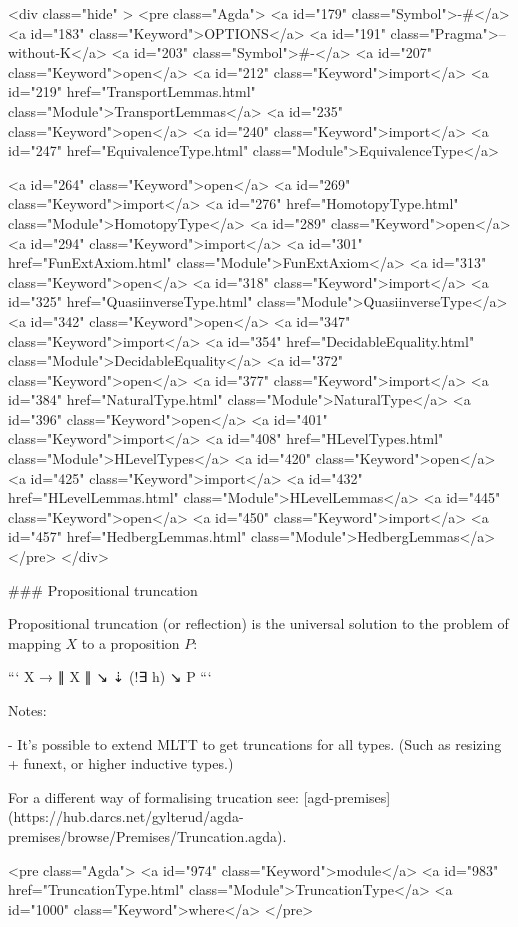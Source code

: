   <div class="hide" >
<pre class="Agda">
<a id="179" class="Symbol">{-#</a> <a id="183" class="Keyword">OPTIONS</a> <a id="191" class="Pragma">--without-K</a> <a id="203" class="Symbol">#-}</a>
<a id="207" class="Keyword">open</a> <a id="212" class="Keyword">import</a> <a id="219" href="TransportLemmas.html" class="Module">TransportLemmas</a>
<a id="235" class="Keyword">open</a> <a id="240" class="Keyword">import</a> <a id="247" href="EquivalenceType.html" class="Module">EquivalenceType</a>

<a id="264" class="Keyword">open</a> <a id="269" class="Keyword">import</a> <a id="276" href="HomotopyType.html" class="Module">HomotopyType</a>
<a id="289" class="Keyword">open</a> <a id="294" class="Keyword">import</a> <a id="301" href="FunExtAxiom.html" class="Module">FunExtAxiom</a>
<a id="313" class="Keyword">open</a> <a id="318" class="Keyword">import</a> <a id="325" href="QuasiinverseType.html" class="Module">QuasiinverseType</a>
<a id="342" class="Keyword">open</a> <a id="347" class="Keyword">import</a> <a id="354" href="DecidableEquality.html" class="Module">DecidableEquality</a>
<a id="372" class="Keyword">open</a> <a id="377" class="Keyword">import</a> <a id="384" href="NaturalType.html" class="Module">NaturalType</a>
<a id="396" class="Keyword">open</a> <a id="401" class="Keyword">import</a> <a id="408" href="HLevelTypes.html" class="Module">HLevelTypes</a>
<a id="420" class="Keyword">open</a> <a id="425" class="Keyword">import</a> <a id="432" href="HLevelLemmas.html" class="Module">HLevelLemmas</a>
<a id="445" class="Keyword">open</a> <a id="450" class="Keyword">import</a> <a id="457" href="HedbergLemmas.html" class="Module">HedbergLemmas</a>
</pre>
</div>

### Propositional truncation

Propositional truncation (or reflection) is the universal
solution to the problem of mapping $X$ to a proposition $P$:

```
X  → ∥ X ∥
 ↘    ⇣ (!∃ h)
    ↘ P 
```

Notes:

 - It's possible to extend MLTT to get truncations for all types.
 (Such as resizing + funext, or higher inductive types.)

For a different way of formalising trucation see:
[agd-premises](https://hub.darcs.net/gylterud/agda-premises/browse/Premises/Truncation.agda).

<pre class="Agda">
<a id="974" class="Keyword">module</a>
  <a id="983" href="TruncationType.html" class="Module">TruncationType</a>
  <a id="1000" class="Keyword">where</a>
</pre>

